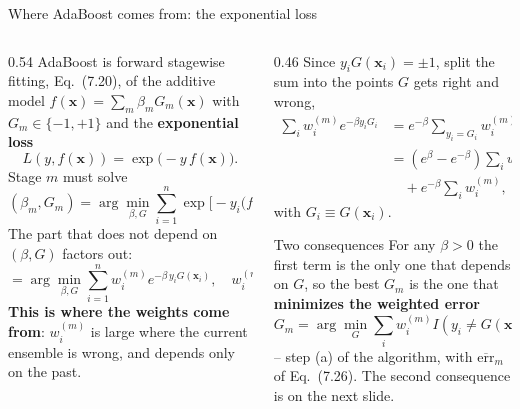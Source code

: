 \documentclass[10pt,aspectratio=169]{beamer}
\newcommand{\err}{\overline{\mathrm{err}}}
\begin{document}
\begin{frame}{Where AdaBoost comes from: the exponential loss}
\begin{columns}[T]
\begin{column}{0.54\textwidth}
\footnotesize
AdaBoost is forward stagewise fitting, Eq.\ (7.20), of the additive model
$f(\bm{x})=\sum_m\beta_m G_m(\bm{x})$ with $G_m\in\{-1,+1\}$ and the
\textbf{exponential loss}
\[
L(y,f(\bm{x}))=\exp\big(-y\,f(\bm{x})\big).\tag{7.23}
\]
Stage $m$ must solve
\[
(\beta_m,G_m)=\arg\min_{\beta,G}\sum_{i=1}^n
\exp\big[-y_i\big(f_{m-1}(\bm{x}_i)+\beta G(\bm{x}_i)\big)\big].
\]
The part that does not depend on $(\beta,G)$ factors out:
\[
=\arg\min_{\beta,G}\sum_{i=1}^n w_i^{(m)}e^{-\beta\,y_iG(\bm{x}_i)},
\quad w_i^{(m)}=e^{-y_if_{m-1}(\bm{x}_i)}.\tag{7.24}
\]
\textbf{This is where the weights come from}: $w_i^{(m)}$ is large where
the current ensemble is wrong, and depends only on the past.
\end{column}
\begin{column}{0.46\textwidth}
\footnotesize
Since $y_iG(\bm{x}_i)=\pm1$, split the sum into the points $G$ gets right and wrong,
\begin{align*}
\sum_i w_i^{(m)}e^{-\beta y_iG_i}
&=e^{-\beta}\!\!\sum_{y_i=G_i}\!\!w_i^{(m)}
 +e^{\beta}\!\!\sum_{y_i\neq G_i}\!\!w_i^{(m)}\\
&=(e^{\beta}-e^{-\beta})\sum_i w_i^{(m)}I(y_i\neq G_i)\\
&\quad+e^{-\beta}\sum_i w_i^{(m)} ,\tag{7.25}
\end{align*}
with $G_i\equiv G(\bm{x}_i)$.
\begin{block}{Two consequences}
For any $\beta>0$ the first term is the only one that depends on $G$, so the
best $G_m$ is the one that \textbf{minimizes the weighted error}
\[
G_m=\arg\min_G\sum_i w_i^{(m)}I(y_i\neq G(\bm{x}_i))
\]
-- step (a) of the algorithm, with $\err_m$ of Eq.\ (7.26).  The second
consequence is on the next slide.
\end{block}
\end{column}
\end{columns}
\end{frame}
\end{document}
